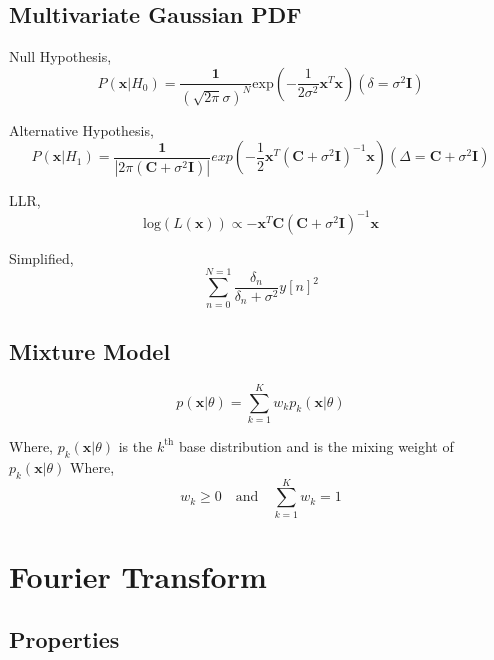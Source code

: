\documentclass[12pt]{article}
\begin{document}
\subsection{Multivariate Gaussian PDF}

Null Hypothesis,
\begin{equation}
    P(\textbf{x}|H_0) = \frac{\textbf{1}}{(\sqrt{2\pi}\sigma)^N} \textrm{exp} \left(- \frac{1}{2\sigma^2} \textbf{x}^T \textbf{x} \right) (\delta = \sigma^2\textbf{I})
\end{equation}

Alternative Hypothesis,
\begin{equation}
    P(\textbf{x}|H_1) = \frac{\textbf{1}}{ | 2\pi(\textbf{C}+\sigma^2\textbf{I})| } exp \left(-\frac{1}{2}\textbf{x}^T(\textbf{C}+\sigma^2\textbf{I})^{-1}\textbf{x}\right)(\Delta = \textbf{C} + \sigma^2\textbf{I})
\end{equation}

LLR,
\begin{equation}
    \textrm{log}(L(\textbf{x})) \propto -\textbf{x}^T\textbf{C}(\textbf{C}+\sigma^2\textbf{I})^{-1}\textbf{x}
\end{equation}

Simplified,
\begin{equation}
    \sum_{n=0}^{N=1} \frac{\delta_n}{\delta_n+\sigma^2}y[n]^2
\end{equation}

\subsection{Mixture Model}
\begin{equation}
    p(\textbf{x} | \theta) = \sum_{k=1}^K w_k p_k (\textbf{x} | \theta)
\end{equation}

Where, $p_k(\textbf{x}|\theta)$ is the $k^{\textrm{th}}$ base distribution and is the mixing weight of $p_k(\textbf{x}|\theta)$ Where,
\begin{equation}
    w_k \geq 0 \quad \textrm{and} \quad \sum_{k=1}^K w_k = 1
\end{equation}

\section{Fourier Transform}

\subsection{Properties}
\end{document}
